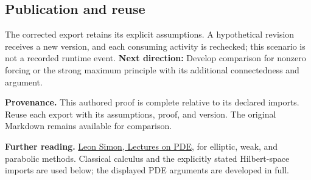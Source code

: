 \documentclass[preprint,12pt,aps,pra,showkeys,amsmath,amssymb,superscriptaddress,floatfix]{revtex4-2}
\theoremstyle{definition}
\theoremstyle{remark}
\begin{document}
\subsection{Publication and reuse}
The corrected export retains its explicit assumptions. A hypothetical
revision receives a new version, and each consuming activity is
rechecked; this scenario is not a recorded runtime event. \textbf{Next
direction:} Develop comparison for nonzero forcing or the strong maximum
principle with its additional connectedness and argument.

\par\medskip\begingroup\small\linespread{1.0}\selectfont\noindent\textbf{Provenance.} This authored proof is complete relative to its declared imports. Reuse
each export with its assumptions, proof, and version. The original
Markdown remains available for comparison.
\par\endgroup

\par\smallskip\begingroup\small\linespread{1.0}\selectfont\noindent\textbf{Further reading.} \href{https://math.stanford.edu/~lms/lecs-on-pde.pdf}{Leon Simon,
Lectures on PDE}, for elliptic, weak, and parabolic methods. Classical
calculus and the explicitly stated Hilbert-space imports are used below;
the displayed PDE arguments are developed in full.\par\endgroup
\end{document}
